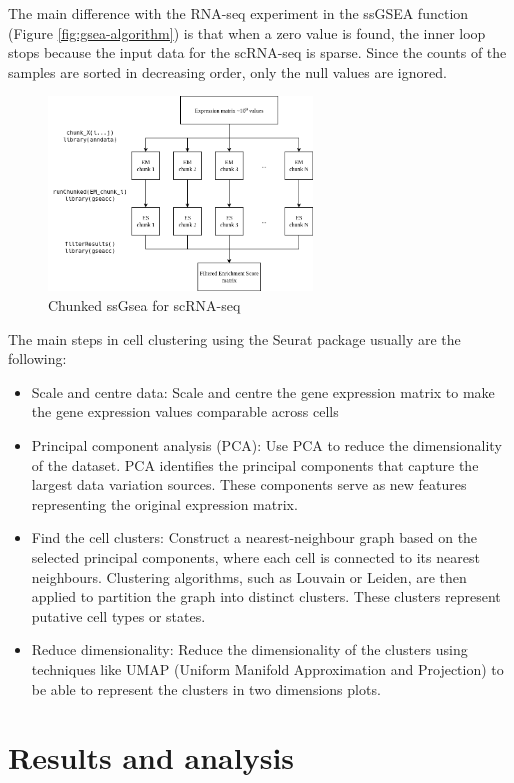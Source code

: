 \documentclass[aps,prb,twocolumn,superscriptaddress,floatfix,longbibliography]{revtex4-2}
\newif\ifptitle
\newif\ifpnumber
\newcounter{para}
\newcommand\ptitle[1]{\par\refstepcounter{para}
{\ifpnumber{\noindent\textcolor{lightgray}{\textbf{\thepara}}\indent}\fi}
{\ifptitle{\textbf{[{#1}]}}\fi}}
\begin{document}
The main difference with the RNA-seq experiment in the ssGSEA function (Figure \ref{fig:gsea-algorithm}) is that when a zero value is found, the inner loop stops because the input data for the scRNA-seq is sparse. Since the counts of the samples are sorted in decreasing order, only the null values are ignored.


\begin{figure}[h]
\centering
\includegraphics[clip=true,width=7cm]{img/gsea-pipeline.png}
\caption{Chunked ssGsea for scRNA-seq}
\label{fig:chunkedgsea}
\end{figure}


\ptitle{Seurat \cite{seurat-v4} \cite{seurat-web}} The main steps in cell clustering using the Seurat package usually are the following:
\begin{itemize}
\item Scale and centre data: Scale and centre the gene expression matrix to make the gene expression values comparable across cells
\item Principal component analysis (PCA): Use PCA to reduce the dimensionality of the dataset. PCA identifies the principal components that capture the largest data variation sources. These components serve as new features representing the original expression matrix.
\item Find the cell clusters: Construct a nearest-neighbour graph based on the selected principal components, where each cell is connected to its nearest neighbours. Clustering algorithms, such as Louvain or Leiden, are then applied to partition the graph into distinct clusters. These clusters represent putative cell types or states.
\item Reduce dimensionality: Reduce the dimensionality of the clusters using techniques like UMAP (Uniform Manifold Approximation and Projection) to be able to represent the clusters in two dimensions plots.
\end{itemize}

\section{\label{sec:Results}Results and analysis}
\end{document}
